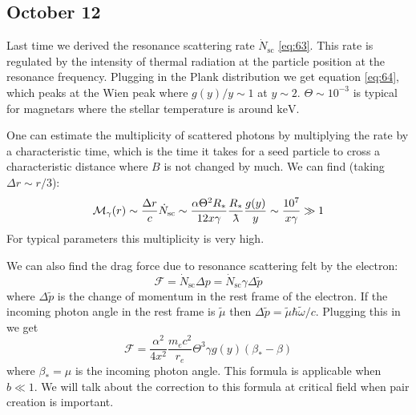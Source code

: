 \documentclass[letterpaper, 11pt]{article}
\newcommand{\lambdabar}{{\mkern0.75mu\mathchar '26\mkern -9.75mu\lambda}}
\numberwithin{equation}{section}
\numberwithin{figure}{section}
\begin{document}
\subsection{October 12}
\label{sec:oct-12}

Last time we derived the resonance scattering rate $\dot{N}_\mathrm{sc}$ \eqref{eq:63}. This rate is regulated by the intensity of thermal radiation at the particle position at the resonance frequency. Plugging in the Plank distribution we get equation \eqref{eq:64}, which peaks at the Wien peak where $g(y)/y \sim 1$ at $y \sim 2$. $\Theta \sim 10^{-3}$ is typical for magnetars where the stellar temperature is around $\mathrm{keV}$.

One can estimate the multiplicity of scattered photons by multiplying the rate by a characteristic time, which is the time it takes for a seed particle to cross a characteristic distance where $B$ is not changed by much. We can find (taking $\Delta r\sim r/3$):
\begin{equation}
    \label{eq:69}
    \mathcal{M}_{\gamma}(r)\sim \frac{\Delta r}{c}\dot{N}_\mathrm{sc} \sim \frac{\alpha\Theta^2R_{*}}{12 x \gamma}\frac{R_{*}}{\lambdabar}\frac{g(y)}{y} \sim \frac{10^7}{x\gamma} \gg 1
\end{equation}
For typical parameters this multiplicity is very high.

We can also find the drag force due to resonance scattering felt by the electron:
\begin{equation}
    \label{eq:70}
    \mathcal{F} = \dot{N}_\mathrm{sc}\Delta p = \dot{N}_\mathrm{sc}\gamma \Delta \tilde{p}
\end{equation}
where $\Delta \tilde{p}$ is the change of momentum in the rest frame of the electron. If the incoming photon angle in the rest frame is $\tilde{\mu}$ then $\Delta \tilde{p} = \tilde{\mu}\hbar\tilde{\omega}/c$. Plugging this in we get
\begin{equation}
    \label{eq:71}
    \mathcal{F} = \frac{\alpha^2}{4x^2}\frac{m_ec^2}{r_e}\Theta^3 \gamma g(y)(\beta_{*} - \beta)
\end{equation}
where $\beta_{*} = \mu$ is the incoming photon angle. This formula is applicable when $b \ll 1$. We will talk about the correction to this formula at critical field when pair creation is important.
\end{document}
